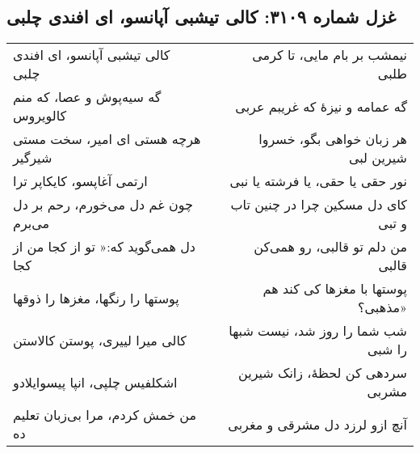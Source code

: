 \begin{center}
\section*{غزل شماره ۳۱۰۹: کالی تیشبی آپانسو، ای افندی چلبی}
\label{sec:3109}
\begin{longtable}{l p{0.5cm} r}
کالی تیشبی آپانسو، ای افندی چلبی
&&
نیمشب بر بام مایی، تا کرمی طلبی
\\
گه سیه‌پوش و عصا، که منم کالویروس
&&
گه عمامه و نیزهٔ که غریبم عربی
\\
هرچه هستی ای امیر، سخت مستی شیرگیر
&&
هر زبان خواهی بگو، خسروا شیرین لبی
\\
ارتمی آغاپسو، کایکاپر ترا
&&
نور حقی یا حقی، یا فرشته یا نبی
\\
چون غم دل می‌خورم، رحم بر دل می‌برم
&&
کای دل مسکین چرا در چنین تاب و تبی
\\
دل همی‌گوید که:« تو از کجا من از کجا
&&
من دلم تو قالبی، رو همی‌کن قالبی
\\
پوستها را رنگها، مغزها را ذوقها
&&
پوستها با مغزها کی کند هم مذهبی؟»
\\
کالی میرا لییری، پوستن کالاستن
&&
شب شما را روز شد، نیست شبها را شبی
\\
اشکلفیس چلپی، انپا پیسوایلادو
&&
سردهی کن لحظهٔ، زانک شیرین مشربی
\\
من خمش کردم، مرا بی‌زبان تعلیم ده
&&
آنچ ازو لرزد دل مشرقی و مغربی
\\
\end{longtable}
\end{center}
